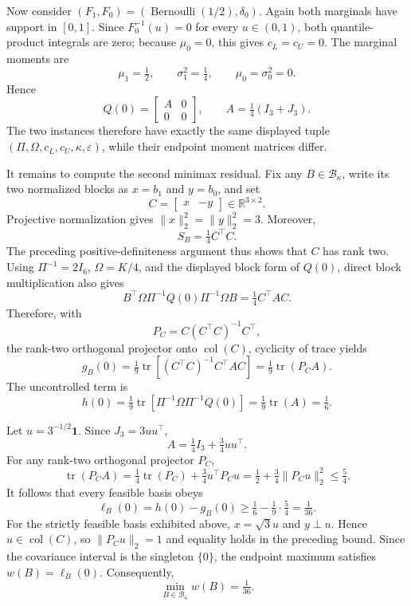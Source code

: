 Now consider \((F_1,F_0)=(\operatorname{Bernoulli}(1/2),\delta_0)\).  Again both marginals have support in \([0,1]\).  Since \(F_0^{-1}(u)=0\) for every \(u\in(0,1)\), both quantile-product integrals are zero; because \(\mu_0=0\), this gives \(c_L=c_U=0\).  The marginal moments are
\[
\mu_1=\tfrac12,
\qquad
\sigma_1^2=\tfrac14,
\qquad
\mu_0=\sigma_0^2=0.
\]
Hence
\[
Q(0)=\begin{bmatrix}A&0\\0&0\end{bmatrix},
\qquad
A=\tfrac14(I_3+J_3).
\]
The two instances therefore have exactly the same displayed tuple \((\Pi,\Omega,c_L,c_U,\kappa,\varepsilon)\), while their endpoint moment matrices differ.

It remains to compute the second minimax residual.  Fix any \(B\in\mathcal B_\kappa\), write its two normalized blocks as \(x=b_1\) and \(y=b_0\), and set
\[
C=\begin{bmatrix}x&-y\end{bmatrix}\in\mathbb R^{3\times2}.
\]
Projective normalization gives \(\lVert x\rVert_2^2=\lVert y\rVert_2^2=3\).  Moreover,
\[
S_B=\tfrac14 C^{\top}C.
\]
The preceding positive-definiteness argument thus shows that \(C\) has rank two.  Using \(\Pi^{-1}=2I_6\), \(\Omega=K/4\), and the displayed block form of \(Q(0)\), direct block multiplication also gives
\[
B^{\top}\Omega\Pi^{-1}Q(0)\Pi^{-1}\Omega B
=\tfrac14 C^{\top}AC.
\]
Therefore, with
\[
P_C=C(C^{\top}C)^{-1}C^{\top},
\]
the rank-two orthogonal projector onto \(\operatorname{col}(C)\), cyclicity of trace yields
\[
g_B(0)
=\tfrac19\operatorname{tr}\!\left[(C^{\top}C)^{-1}C^{\top}AC\right]
=\tfrac19\operatorname{tr}(P_CA).
\]
The uncontrolled term is
\[
h(0)
=\tfrac19\operatorname{tr}\!\left[\Pi^{-1}\Omega\Pi^{-1}Q(0)\right]
=\tfrac19\operatorname{tr}(A)
=\tfrac16.
\]

Let \(u=3^{-1/2}\mathbf 1\).  Since \(J_3=3uu^{\top}\),
\[
A=\tfrac14I_3+\tfrac34uu^{\top}.
\]
For any rank-two orthogonal projector \(P_C\),
\[
\operatorname{tr}(P_CA)
=\tfrac14\operatorname{tr}(P_C)+\tfrac34u^{\top}P_Cu
=\tfrac12+\tfrac34\lVert P_Cu\rVert_2^2
\le\tfrac54.
\]
It follows that every feasible basis obeys
\[
\ell_B(0)=h(0)-g_B(0)
\ge \tfrac16-\tfrac19\cdot\tfrac54
=\tfrac1{36}.
\]
For the strictly feasible basis exhibited above, \(x=\sqrt3u\) and \(y\perp u\).  Hence \(u\in\operatorname{col}(C)\), so \(\lVert P_Cu\rVert_2=1\) and equality holds in the preceding bound.  Since the covariance interval is the singleton \(\{0\}\), the endpoint maximum satisfies \(w(B)=\ell_B(0)\).  Consequently,
\[
\min_{B\in\mathcal B_\kappa}w(B)=\tfrac1{36}.
\]

